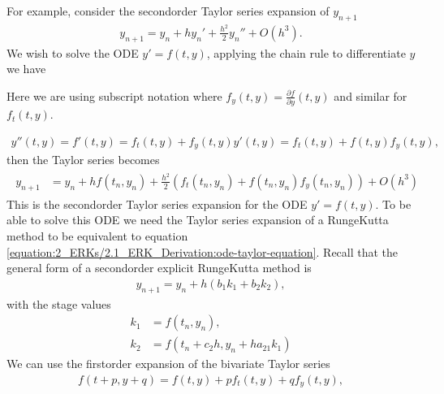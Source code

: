 \documentclass[letterpaper,10pt,english]{jupyterBook}
\begin{document}
\sphinxAtStartPar
For example, consider the second\sphinxhyphen{}order Taylor series expansion of \(y_{n+1}\)
\begin{align*}
    y_{n+1} = y_n + h y_n' + \frac{h^2}{2} y_n'' + O(h^3).
\end{align*}
\sphinxAtStartPar
We wish to solve the ODE \(y' = f(t,y)\), applying the chain rule to differentiate \(y\) we have%
\begin{footnote}[1]\sphinxAtStartFootnote
Here we are using subscript notation where \(f_y(t, y) = \frac{\partial f}{\partial y}(t ,y)\) and similar for \(f_t(t, y)\).
%
\end{footnote}
\begin{align*}
    y''(t, y) = f'(t, y) = f_t(t, y) + f_y(t, y) y'(t, y) = f_t(t, y) + f(t, y) f_y(t, y),
\end{align*}
\sphinxAtStartPar
then the Taylor series becomes
\begin{equation}\label{equation:2_ERKs/2.1_ERK_Derivation:ode-taylor-equation}
\begin{split}\begin{align*}
    y_{n+1} &= y_n + h f(t_n, y_n) + \frac{h^2}{2}(f_t(t_n, y_n) + f(t_n, y_n) f_y(t_n, y_n)) + O(h^3)
\end{align*}\end{split}
\end{equation}
\sphinxAtStartPar
This is the second\sphinxhyphen{}order Taylor series expansion for the ODE \(y' = f(t,y)\). To be able to solve this ODE we need the Taylor series expansion of a Runge\sphinxhyphen{}Kutta method to be equivalent to equation \eqref{equation:2_ERKs/2.1_ERK_Derivation:ode-taylor-equation}. Recall that the general form of a second\sphinxhyphen{}order explicit Runge\sphinxhyphen{}Kutta method is
\begin{equation}\label{equation:2_ERKs/2.1_ERK_Derivation:general-rk2-equation}
\begin{split}y_{n+1} = y_n + h(b_1 k_1 + b_2 k_2),\end{split}
\end{equation}
\sphinxAtStartPar
with the stage values
\begin{align*}
    k_1 &= f(t_n, y_n), \\
    k_2 &= f(t_n + c_2 h, y_n + h a_{21} k_1)
\end{align*}
\sphinxAtStartPar
We can use the first\sphinxhyphen{}order expansion of the bivariate Taylor series
\begin{align*}
    f(t + p, y + q) = f(t, y) + p f_t(t, y) + q f_y(t, y),
\end{align*}
\end{document}
